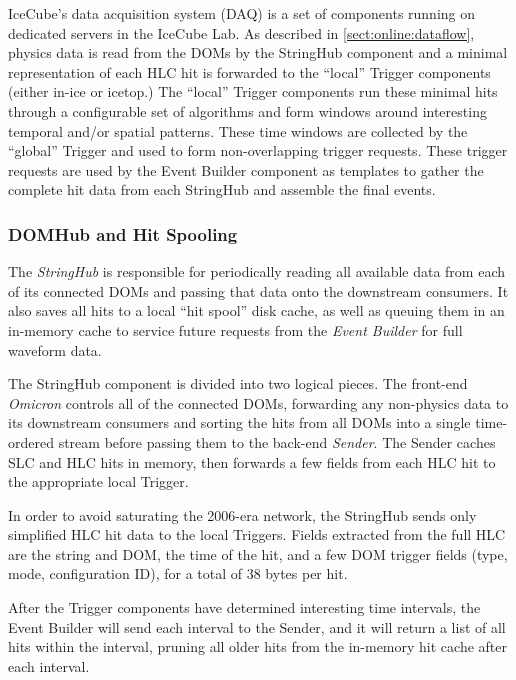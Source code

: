 IceCube's data acquisition system (DAQ) is a set of components running on
dedicated servers in the IceCube Lab.  As described in
\ref{sect:online:dataflow}, physics data is read from the DOMs by the StringHub
component and a minimal representation of each HLC hit is forwarded to the
``local'' Trigger components (either in-ice or icetop.)
The ``local'' Trigger components run these
minimal hits through a configurable set of algorithms and form windows around
interesting temporal and/or spatial patterns.  These time windows are collected
by the ``global'' Trigger and used to form non-overlapping trigger requests.
These trigger requests are used by the Event Builder component as templates to
gather the complete hit data from each StringHub and assemble the final events.

\subsubsection{DOMHub and Hit Spooling}

The \emph{StringHub} is responsible for periodically reading all available data
from each of its connected DOMs and passing that data onto the downstream
consumers.  It also saves all hits to a local ``hit spool'' disk cache, as
well as queuing them in an in-memory cache to service future requests from
the \emph{Event Builder} for full waveform data.

The StringHub component is divided into two logical pieces.  The front-end
\emph{Omicron} controls all of the connected DOMs, forwarding any
non-physics data to its downstream consumers and sorting the hits from all
DOMs into a single time-ordered stream
before passing them to the back-end \emph{Sender}.  The Sender
caches SLC and HLC hits in memory, then forwards a few fields from each HLC
hit to the appropriate local Trigger.

In order to avoid saturating the 2006-era network, the StringHub sends only
simplified HLC hit data to the local Triggers.  Fields extracted from the
full HLC are the string and DOM, the time of the hit, and a few DOM trigger
fields (type, mode, configuration ID), for a total of 38 bytes per hit.

After the Trigger components have determined interesting time intervals, the
Event Builder will send each interval to the Sender, and it will return a list
of all hits within the interval, pruning all older
hits from the in-memory hit cache after each interval.

